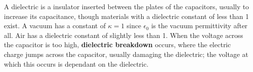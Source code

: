 A dielectric is a insulator inserted between the plates of the capacitors,
usually to increase its capacitance,
though materials with a dielectric constant of less than 1 exist.
A vacuum has a constant of \(\kappa = 1\)
since \(\epsilon_0\) is the vacuum permittivity after all.
Air has a dielectric constant of slightly less than 1.
When the voltage across the capacitor is too high,
\textbf{dielectric breakdown} occurs,
where the electric charge jumps across the capacitor,
usually damaging the dielectric;
the voltage at which this occurs is dependant on the dielectric.
